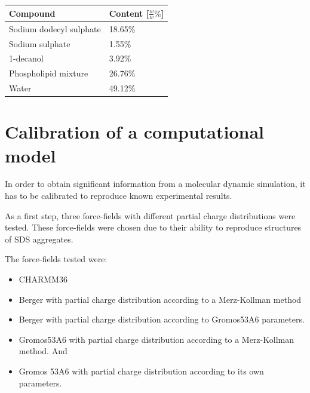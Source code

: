 \documentclass[9pt]{article}
\begin{document}
\begin{table}[h]
\small
  \caption{\ }
  \label{tab:mimetic_composition}
  \begin{tabular*}{0.48\textwidth}{@{\extracolsep{\fill}}ll}
    \hline
    Compound & Content [$\tfrac{w}{w}\%$] \\
    \hline
    Sodium dodecyl sulphate &  18.65\% \\
    Sodium sulphate & 1.55\%  \\
    1-decanol & 3.92\%  \\
    Phospholipid mixture & 26.76\%  \\
    Water & 49.12\% \\
    \hline
  \end{tabular*}
\end{table}

\section{Calibration of a computational model}
\label{sec:calib}

In order to obtain significant information from a molecular dynamic simulation,
it has to be calibrated to reproduce known experimental results. \par As a first
step, three force-fields with different partial charge distributions were
tested. These force-fields were chosen due to their ability to reproduce
structures of SDS aggregates.\par
The force-fields tested were:
\begin{itemize}
\item CHARMM36
\item Berger with partial charge distribution according to a Merz-Kollman
  method
\item Berger with partial charge distribution according to Gromos53A6
  parameters.
\item Gromos53A6 with partial charge distribution according to a Merz-Kollman
  method. And
\item Gromos 53A6 with partial charge distribution according to its own parameters.
\end{itemize}
\end{document}
